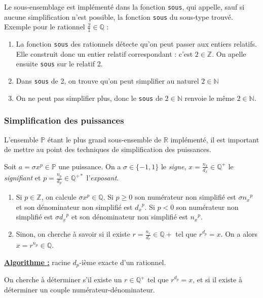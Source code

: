 \documentclass[french]{article}
\newcommand{\p}{\texttt} %
\begin{document}
Le sous-ensemblage est implémenté dans la fonction \p{sous}, qui appelle, sauf si aucune simplification n'est possible, la fonction \p{sous} du sous-type trouvé.
Exemple pour le rationnel $\frac{2}{1} \in \mathbb{Q}$ :
\begin{enumerate}
  \item La fonction \p{sous} des rationnels détecte qu'on peut passer aux entiers relatifs. Elle construit donc un entier relatif correspondant : c'est $2 \in \mathbb{Z}$. On apelle ensuite \p{sous} sur le relatif 2.
  \item Dans \p{sous} de 2, on trouve qu'on peut simplifier au naturel $2 \in \mathbb{N}$
  \item On ne peut pas simplifier plus, donc le \p{sous} de $2 \in \mathbb{N}$ renvoie le même $2 \in \mathbb{N}$.
\end{enumerate}

\subsubsection{Simplification des puissances}

L'ensemble $\mathbb{P}$ étant le plus grand sous-ensemble de $\mathbb{R}$ implémenté, il est important de mettre au point des techniques de simplification des puissances.

Soit $a = \sigma x ^ p \in \mathbb{P}$ une puissance. On a $\sigma \in \{-1, 1\}$ le \textit{signe}, $x = \frac{n_x}{d_x} \in \mathbb{Q}^+$ le \textit{signifiant} et $p = \frac{n_p}{d_p} \in \mathbb{Q}^{+*}$ l'\textit{exposant}.

\begin{enumerate}
  \item Si $p \in \mathbb{Z}$, on calcule $\sigma x ^ p \in \mathbb{Q}$. Si $p \ge 0$ son numérateur non simplifié est $\sigma {n_x}^p$ et son dénominateur non simplifié est ${d_x}^p$. Si $p < 0$ son numérateur non simplifié est $\sigma {d_x}^p$ et son dénominateur non simplifié est ${n_x}^p$.
  \item Sinon, on cherche à savoir si il existe $r = \frac{n_r}{d_r} \in \mathbb{Q}+$ tel que $r^{d_p} = x$. On a alors $x = r^{n_p} \in \mathbb{Q}$.
\end{enumerate}

\noindent \textbf{\underline{Algorithme :}} racine $d_p$-ième exacte d'un rationnel.

\noindent On cherche à déterminer s'il existe un $r \in \mathbb{Q}^+$ tel que $r^{d_p} = x$, et si il existe à déterminer un couple numérateur-dénominateur.
\end{document}

